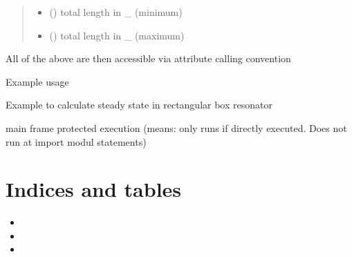 \documentclass[letterpaper,10pt,english]{sphinxmanual}
\begin{document}
\begin{fulllineitems}
\begin{fulllineitems}
\begin{quote}
\begin{description}
\begin{itemize}
\item {} 
 () \textendash{} total length in \_ (minimum)

\item {} 
 () \textendash{} total length in \_ (maximum)

\end{itemize}

\end{description}\end{quote}

All of the above are then accessible via attribute calling convention
\begin{description}
\item[{Example usage}] \leavevmode
{}%
\begin{sphinxVerbatim}[commandchars=\\\{\}]
\end{sphinxVerbatim}

\end{description}

\end{fulllineitems}


\end{fulllineitems}


\begin{fulllineitems}
\label{\detokenize{FIT:FIT.main}}
Example to calculate steady state in rectangular box resonator

main frame protected execution (means: only runs if directly executed. Does not run at import modul statements)

\end{fulllineitems}



\chapter{Indices and tables}
\label{\detokenize{index:indices-and-tables}}\begin{itemize}
\item {} 

\item {} 

\item {} 

\end{itemize}
\end{document}
